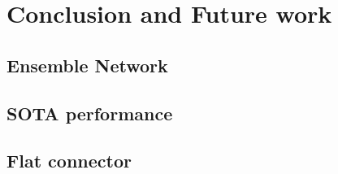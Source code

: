 \chapter{Conclusion and Future work}
\label{chap:conclusion}

\section{Ensemble Network}
\label{sec:ensembleconclusion}

\section{SOTA performance}
\label{sec:ensembleconclusion}

\section{Flat connector}
\label{sec:flatconnector}
